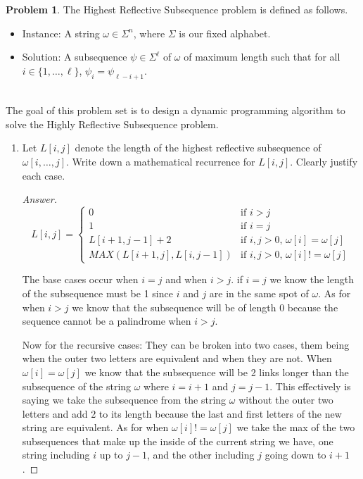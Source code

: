 \documentclass[11pt]{article}
\theoremstyle{definition}
\theoremstyle{definition}
\newtheorem{required}{Problem}
\theoremstyle{definition}
\begin{document}
\begin{required}
The \textsf{Highest Reflective Subsequence} problem is defined as follows.
\begin{itemize}
\item \textsf{Instance:} A string $\omega \in \Sigma^{n}$, where $\Sigma$ is our fixed alphabet.
\item \textsf{Solution:} A subsequence $\psi \in \Sigma^{\ell}$ of $\omega$ of maximum length such that for all $i \in \{1, \ldots, \ell\}$, $\psi_{i} = \psi_{\ell - i + 1}$.
\end{itemize}


\noindent \\ The goal of this problem set is to design a dynamic programming algorithm to solve the \textsf{Highly Reflective Subsequence} problem.

\begin{enumerate}[label=(\alph*)]
\subsection{Problem 2\ref{2a}}
\item \label{2a} Let $L[i, j]$ denote the length of the highest reflective subsequence of $\omega[i, \ldots, j]$. Write down a mathematical recurrence for $L[i, j]$. Clearly justify each case.

\begin{proof}[Answer]



$$
L[i,j] =\begin{cases}
 0 & \text{if $i>j $} \\  
 1 & \text{if $i=j$} \\  
 L[i+1,j-1] + 2 & \text{if $i,j>0$,  $\omega[i] = \omega[j] $}  \\
 MAX(L[i+1,j], L[i,j-1]) & \text{if $i,j>0$, $\omega[i]  != \omega[j]$}
		 \end{cases}
$$

The base cases occur when $i =j $ and when $i>j$. if $i = j$ we know the length of the subsequence must be 1 since $i$ and $j$ are in the same spot of $\omega$. As for when $i>j$ we know that the subsequence will be of length 0 because the sequence cannot be a palindrome when $i>j$. 

Now for the recursive cases: They can be broken into two cases, them being when the outer two letters are equivalent and when they are not. When $\omega[i] = \omega[j] $ we know that the subsequence will be 2 links longer than the subsequence of the string $\omega$ where $i = i +1$ and $j = j -1$. This effectively is saying we take the subsequence from the string $\omega$ without the outer two letters and add 2 to its length because the last and first letters of the new string are equivalent. As for when $\omega[i]  != \omega[j]$ we take the max of the two subsequences that make up the inside of the current string we have, one string including $i$ up to $j-1$, and the other including $j$ going down to $i+1$.


\end{proof}
\end{enumerate}
\end{required}
\end{document}

